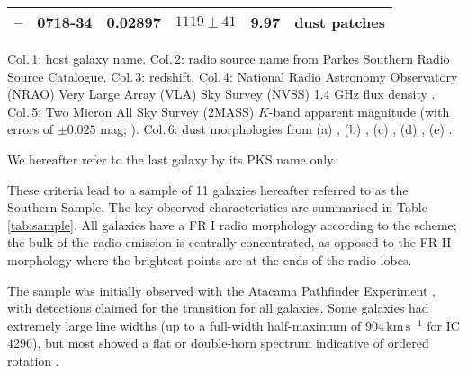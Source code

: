 \documentclass[fleqn,usenatbib,useAMS]{mnras}
\begin{document}
\begin{table*}
\begin{threeparttable}
\begin{tabular}{l l r r r l}
			--			& 0718-\leavevmode\phantom{0}34 		& 0.02897 	& $1119 \pm 41$		& 9.97 & dust patches\tnote{e} \\
			\hline
			\hline
		\end{tabular}
		\begin{tablenotes}
		\footnotesize
		\note Col.\,1: host galaxy name. Col.\,2: radio source name from Parkes Southern Radio Source Catalogue. Col.\,3: redshift. Col.\,4: National Radio Astronomy Observatory (NRAO) Very Large Array (VLA) Sky Survey (NVSS) 1.4 GHz flux density \citep{Condon1998}. Col.\,5: Two Micron All Sky Survey (2MASS) $K$-band apparent magnitude (with errors of $\pm 0.025$ mag; \citealt{Skrutskie2006}). Col.\,6: dust morphologies from (a) \citet{Govoni2000}, (b) \citet{Lauer2005}, (c) \citet{Bettoni2001}, (d) \citet{Sandage1979}, (e) \citet{Colbert2001}. 
		\item We hereafter refer to the last galaxy by its PKS name only.
		\end{tablenotes}
	\end{threeparttable}
	\end{table*}

	These criteria lead to a sample of 11 galaxies hereafter referred to as the Southern Sample. The key observed characteristics are summarised in Table \ref{tab:sample}.
	All galaxies have a FR I radio morphology according to the \citet{Fanaroff1974} scheme; the bulk of the radio emission is centrally-concentrated, as opposed to the FR II morphology where the brightest points are at the ends of the radio lobes. 
	
	The sample was initially observed with the Atacama Pathfinder Experiment \citep[APEX; ][]{Gusten2006}, with detections claimed for the  transition for all galaxies. Some galaxies had extremely large line widths (up to a full-width half-maximum of $904 \, \mathrm{km \, s^{-1}}$ for IC 4296), but most showed a flat or double-horn spectrum indicative of ordered rotation \citep{Prandoni2012}.

\end{document}
